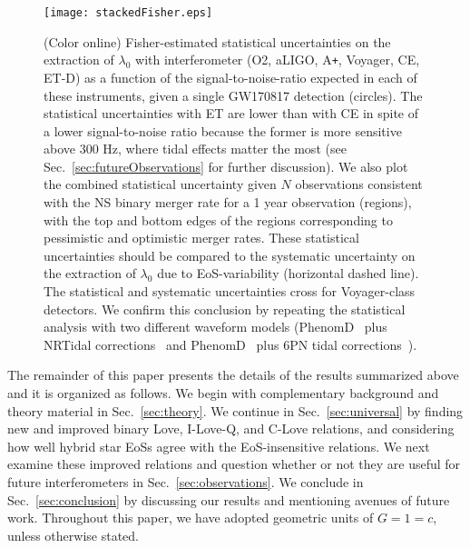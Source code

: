 \documentclass[prd,twocolumn,nofootinbib,superscriptaddress,amsmath,amssymb]{revtex4-1}
\begin{document}
\begin{figure}
\begin{center} 
\texttt{[image: stackedFisher.eps]}
\end{center}
\caption{(Color online) Fisher-estimated statistical uncertainties on the extraction of $\lambda_{0}$ with interferometer (O2, aLIGO, A\texttt{+}, Voyager, CE, ET-D) as a function of the signal-to-noise-ratio expected in each of these instruments, given a single GW170817 detection (circles). The statistical uncertainties with ET are lower than with CE in spite of a lower signal-to-noise ratio because the former is more sensitive above 300 Hz, where tidal effects matter the most (see Sec.~\ref{sec:futureObservations} for further discussion). We also plot the combined statistical uncertainty given $N$ observations consistent with the NS binary merger rate for a 1 year observation (regions), with the top and bottom edges of the regions corresponding to pessimistic and optimistic merger rates. These statistical uncertainties should be compared to the systematic uncertainty on the extraction of $\lambda_{0}$ due to EoS-variability (horizontal dashed line). The statistical and systematic uncertainties cross for Voyager-class detectors. We confirm this conclusion by repeating the statistical analysis with two different waveform models (PhenomD~\cite{PhenomDI,PhenomDII} plus NRTidal corrections~\cite{Dietrich:2017aum,Samajdar:NRTidal} and PhenomD~\cite{PhenomDI,PhenomDII} plus 6PN tidal corrections~\cite{Vines:2011ud,Wade:tidalCorrections}).}
\label{fig:stackedFisher}
\end{figure} 

The remainder of this paper presents the details of the results summarized above and it is organized as follows. 
We begin with complementary background and theory material in Sec.~\ref{sec:theory}.
We continue in Sec.~\ref{sec:universal} by finding new and improved binary Love, I-Love-Q, and C-Love relations, and considering how well hybrid star EoSs agree with the EoS-insensitive relations.
We next examine these improved relations and question whether or not they are useful for future interferometers in Sec.~\ref{sec:observations}.
We conclude in Sec.~\ref{sec:conclusion} by discussing our results and mentioning avenues of future work.
Throughout this paper, we have adopted geometric units of $G=1=c$, unless otherwise stated.

\end{document}
